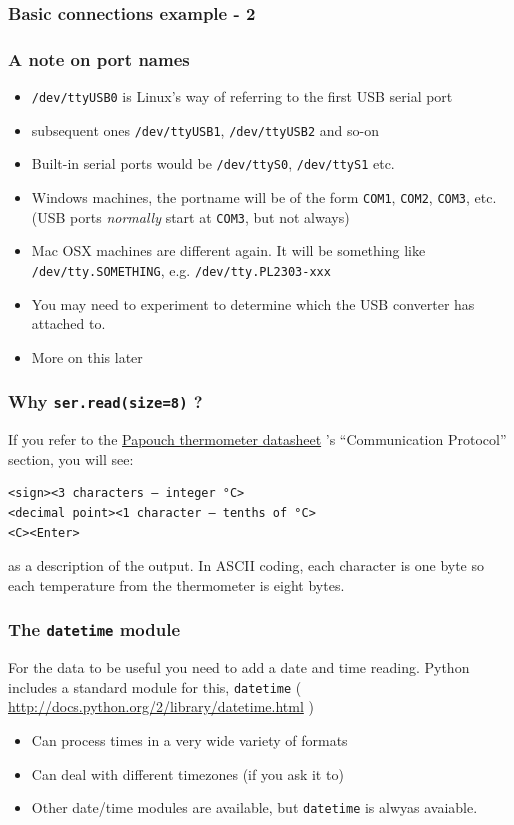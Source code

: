 \documentclass[aspectratio=1610,9pt]{beamer} %
\begin{document}
\begin{frame}[fragile]
\frametitle{Basic connections example - 2}

\subsubsection{A note on port names}

\begin{itemize}
\itemsep1pt\parskip0pt
\item
  \texttt{/dev/ttyUSB0} is Linux's way of referring to the first USB
  serial port
\item
  subsequent ones \texttt{/dev/ttyUSB1}, \texttt{/dev/ttyUSB2} and so-on
\item
  Built-in serial ports would be \texttt{/dev/ttyS0},
  \texttt{/dev/ttyS1} etc.
\item
  Windows machines, the portname will be of the form \texttt{COM1},
  \texttt{COM2}, \texttt{COM3}, etc. (USB ports \emph{normally} start at
  \texttt{COM3}, but not always)
\item
  Mac OSX machines are different again. It will be something like
  \texttt{/dev/tty.SOMETHING}, e.g. \texttt{/dev/tty.PL2303-xxx}
\item
  You may need to experiment to determine which the USB converter has
  attached to.
\item
  More on this later
\end{itemize}

\end{frame}
\begin{frame}[fragile]
\frametitle{Why \texttt{ser.read(size=8)} ?}
If you refer to the
\href{http://www.papouch.com/en/shop/product/tm-rs232-thermometer/tm_en.pdf}{Papouch
thermometer datasheet} 's ``Communication Protocol'' section, you will
see:

\begin{verbatim}
<sign><3 characters – integer °C>
<decimal point><1 character – tenths of °C>
<C><Enter>
\end{verbatim}

as a description of the output. In ASCII coding, each character is one
byte so each temperature from the thermometer is eight bytes.

\end{frame}
\begin{frame}
\frametitle{The \texttt{datetime} module}

For the data to be useful you need to add a date and time reading.
Python includes a standard module for this, \texttt{datetime} (
\url{http://docs.python.org/2/library/datetime.html}
)
\begin{itemize}
\item Can process times in a very wide variety of formats
\item Can deal with different timezones (if you ask it to)
\item Other date/time modules are available, but \texttt{datetime} is alwyas avaiable.
\end{itemize}
\end{frame}
\end{document}
